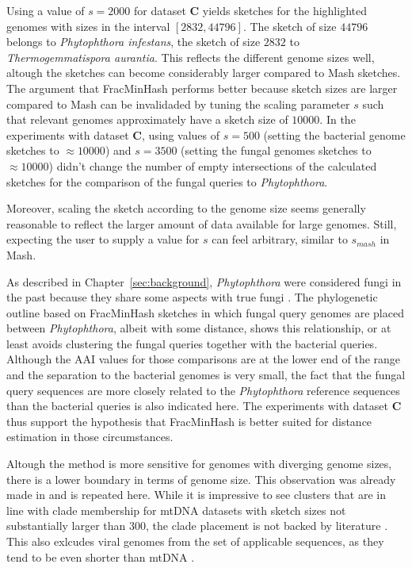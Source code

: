 Using a value of $s=2000$ for dataset \textbf{C} yields sketches for the
highlighted genomes with sizes in the interval $[2832, 44796]$. The sketch of
size $44796$ belongs to \textit{Phytophthora infestans}, the sketch of size
$2832$ to \textit{Thermogemmatispora aurantia}. This reflects the different
genome sizes well, altough the sketches can become considerably larger compared
to Mash sketches. The argument that FracMinHash performs better because sketch
sizes are larger compared to Mash can be invalidaded by tuning the scaling
parameter $s$ such that relevant genomes approximately have a sketch size of
$10000$. In the experiments with dataset \textbf{C}, using values of $s=500$
(setting the bacterial genome sketches to $\approx 10000$) and $s=3500$ (setting
the fungal genomes sketches to $\approx 10000$) didn't change the number of
empty intersections of the calculated sketches for the comparison of the fungal
queries to \textit{Phytophthora}. 

Moreover, scaling the sketch according to the genome size seems generally
reasonable to reflect the larger amount of data available for large genomes.
Still, expecting the user to supply a value for $s$ can feel arbitrary, similar
to $s_{mash}$ in Mash.

As described in Chapter~\ref{sec:background}, \textit{Phytophthora} were
considered fungi in the past because they share some aspects with true fungi
\cite{debaryResearchesNaturePotatofungus1876,rossmanWhyArePhytophthora2012}. The
phylogenetic outline based on FracMinHash sketches in which fungal query genomes
are placed between \textit{Phytophthora}, albeit with some distance, shows this
relationship, or at least avoids clustering the fungal queries together with the
bacterial queries. Although the AAI values for those comparisons are at the
lower end of the range and the separation to the bacterial genomes is very
small, the fact that the fungal query sequences are more closely related to the
\textit{Phytophthora} reference sequences than the bacterial queries is also
indicated here. The experiments with dataset \textbf{C} thus support the
hypothesis that FracMinHash is better suited for distance estimation in those
circumstances.

Altough the method is more sensitive for genomes with diverging genome sizes,
there is a lower boundary in terms of genome size. This observation was already
made in
\cite{irberLightweightCompositionalAnalysis2022,heraDerivingConfidenceIntervals2023}
and is repeated here. While it is impressive to see clusters that are in line
with clade membership for mtDNA datasets with sketch sizes not substantially
larger than $300$, the clade placement is not backed by literature
\cite{winkworthComparativeAnalysesComplete2022,abadPhytophthoraTaxonomicPhylogenetic2023a,
yangExpandedPhylogenyGenus2017}. This also exlcudes viral genomes from the set
of applicable sequences, as they tend to be even shorter than mtDNA
\cite{dimmockIntroductionModernVirology2001}.

